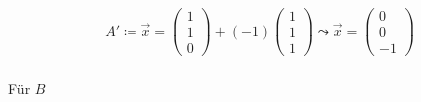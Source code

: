 \begin{gather}
A'\coloneqq \vec{x} = \begin{pmatrix}
1\\1\\0
\end{pmatrix}+(-1) \begin{pmatrix}
1\\1\\1
\end{pmatrix} 
\leadsto \vec{x} =
\begin{pmatrix}
0\\0\\-1
\end{pmatrix}
\end{gather}\\


Für \ensuremath{B}  %

